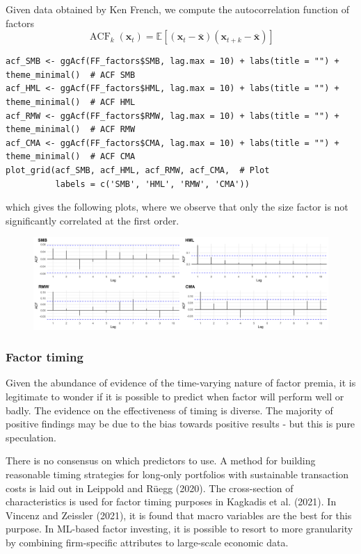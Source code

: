 Given data obtained by Ken French, we compute the autocorrelation function of factors
\begin{equation*}
    \operatorname{ACF}_{k}(\mathbf{x}_{t}) = \mathbb{E}[(\mathbf{x}_{t} - \bar{\mathbf{x}})(\mathbf{x}_{t+k} - \bar{\mathbf{x}})]
\end{equation*}

\begin{lstlisting}
acf_SMB <- ggAcf(FF_factors$SMB, lag.max = 10) + labs(title = "") + theme_minimal()  # ACF SMB
acf_HML <- ggAcf(FF_factors$HML, lag.max = 10) + labs(title = "") + theme_minimal()  # ACF HML
acf_RMW <- ggAcf(FF_factors$RMW, lag.max = 10) + labs(title = "") + theme_minimal()  # ACF RMW
acf_CMA <- ggAcf(FF_factors$CMA, lag.max = 10) + labs(title = "") + theme_minimal()  # ACF CMA
plot_grid(acf_SMB, acf_HML, acf_RMW, acf_CMA,  # Plot
          labels = c('SMB', 'HML', 'RMW', 'CMA'))
\end{lstlisting}
which gives the following plots, where we observe that only the size factor is not significantly correlated at the first order.
\begin{figure}[H]
    \centering
    \includegraphics[width=\textwidth]{part_1/images/factor_autocorrelation.png}
\end{figure}

\subsubsection{Factor timing}
Given the abundance of evidence of the time-varying nature of factor premia, it is legitimate to wonder if it is possible to predict when factor will perform well or badly. The evidence on the effectiveness of timing is diverse. The majority of positive findings may be due to the bias towards positive results - but this is pure speculation.

There is no consensus on which predictors to use. A method for building reasonable timing strategies for long-only portfolios with sustainable transaction costs is laid out in Leippold and Rüegg (2020). The cross-section of characteristics is used for factor timing purposes in Kagkadis et al. (2021). In Vincenz and Zeissler (2021), it is found that macro variables are the best for this purpose. In ML-based factor investing, it is possible to resort to more granularity by combining firm-specific attributes to large-scale economic data.

